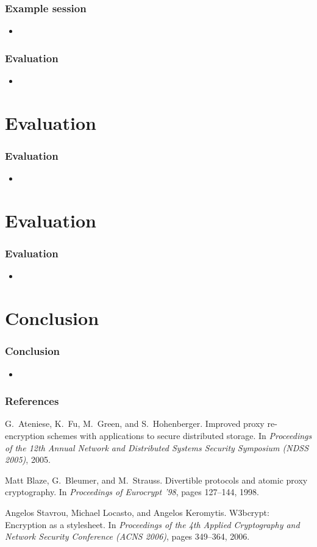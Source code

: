 \documentclass{beamer}
\begin{document}
\begin{frame}
\frametitle{Example session}
\begin{itemize}
\item
\end{itemize}
\end{frame}

\begin{frame}
\frametitle{Evaluation}
\begin{itemize}
\item
\end{itemize}
\end{frame}

\section{Evaluation}
\begin{frame}
\frametitle{Evaluation}
\begin{itemize}
\item
\end{itemize}
\end{frame}

\section{Evaluation}
\begin{frame}
\frametitle{Evaluation}
\begin{itemize}
\item
\end{itemize}
\end{frame}

\section{Conclusion}
\begin{frame}
\frametitle{Conclusion}
\begin{itemize}
\item
\end{itemize}
\end{frame}

\begin{thebibliography}{10}
\frametitle{References}
G.~Ateniese, K.~Fu, M.~Green, and S.~Hohenberger.
\newblock Improved proxy re-encryption schemes with applications to secure
  distributed storage.
\newblock In {\em Proceedings of the 12th Annual Network and Distributed
  Systems Security Symposium (NDSS 2005)}, 2005.

Matt Blaze, G.~Bleumer, and M.~Strauss.
\newblock Divertible protocols and atomic proxy cryptography.
\newblock In {\em Proceedings of Eurocrypt '98}, pages 127--144, 1998.

Angelos Stavrou, Michael Locasto, and Angelos Keromytis.
\newblock W3bcrypt: Encryption as a stylesheet.
\newblock In {\em Proceedings of the 4th Applied Cryptography and Network
  Security Conference (ACNS 2006)}, pages 349--364, 2006.

\end{thebibliography}
\end{document}
